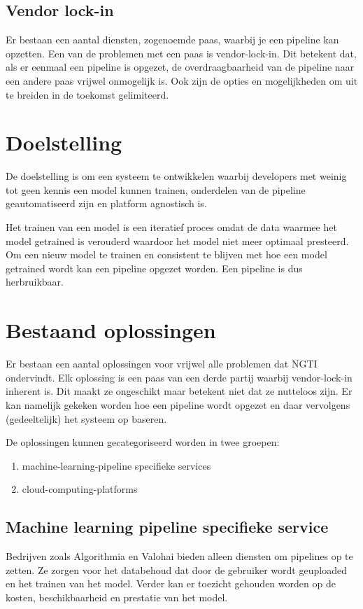 \subsection{Vendor lock-in}\label{sec:vendor-lock-in}
Er bestaan een aantal diensten, zogenoemde \acrfull{paas}, waarbij je een pipeline kan opzetten. Een van de problemen met een \acrshort{paas} is \gls{vendor-lock-in}. Dit betekent dat, als er eenmaal een pipeline is opgezet, de overdraagbaarheid van de pipeline naar een andere \acrshort{paas} vrijwel onmogelijk is. Ook zijn de opties en mogelijkheden om uit te breiden in de toekomst gelimiteerd.

\section{Doelstelling}\label{sec:doelstelling}
De doelstelling is om een systeem te ontwikkelen waarbij developers met weinig tot geen kennis een model kunnen trainen, onderdelen van de pipeline geautomatiseerd zijn en platform agnostisch is.

Het trainen van een model is een iteratief proces omdat de data waarmee het model getrained is verouderd waardoor het model niet meer optimaal presteerd. Om een nieuw model te trainen en consistent te blijven met hoe een model getrained wordt kan een pipeline opgezet worden. Een pipeline is dus herbruikbaar.

\section{Bestaand oplossingen}\label{sec:bestaande-oplossingen}
Er bestaan een aantal oplossingen voor vrijwel alle problemen dat NGTI ondervindt. Elk oplossing is een \acrshort{paas} van een derde partij waarbij \gls{vendor-lock-in} inherent is. Dit maakt ze ongeschikt maar betekent niet dat ze nutteloos zijn. Er kan namelijk gekeken worden hoe een pipeline wordt opgezet en daar vervolgens (gedeeltelijk) het systeem op baseren.

De oplossingen kunnen gecategoriseerd worden in twee groepen:
\begin{enumerate}
  \item \Gls{machine-learning-pipeline} specifieke services
  \item \Glspl{cloud-computing-platform}
\end{enumerate}

\subsection{Machine learning pipeline specifieke service}\label{subsec:machine-learning-pipeline-specifieke-service}
Bedrijven zoals Algorithmia \cite{algorithmia-website} en Valohai \cite{valohai-website} bieden alleen diensten om pipelines op te zetten. Ze zorgen voor het databehoud dat door de gebruiker wordt geuploaded en het trainen van het model. Verder kan er toezicht gehouden worden op de kosten, beschikbaarheid en prestatie van het model.

